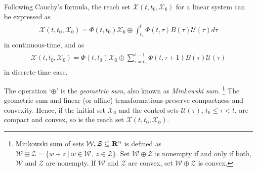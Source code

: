 \documentclass[letterpaper,10pt,english]{sphinxmanual}
\begin{document}
Following Cauchy’s formula, the reach set
${\mathcal X}(t, t_0, {\mathcal X}_0)$ for a linear system can be
expressed as
\label{chap_reach:equation-ctlsrs}\begin{gather}
\begin{split}{\mathcal X}(t, t_0, {\mathcal X}_0) =
\Phi(t, t_0){\mathcal X}_0 \oplus \int_{t_0}^t\Phi(t, \tau)B(\tau){\mathcal U}(\tau)d\tau\end{split}\label{chap_reach-ctlsrs}
\end{gather}
in continuous-time, and as
\label{chap_reach:equation-dtlsrs}\begin{gather}
\begin{split}{\mathcal X}(t, t_0, {\mathcal X}_0) =
\Phi(t, t_0){\mathcal X}_0 \oplus \sum_{\tau=t_0}^{t-1}\Phi(t, \tau+1)B(\tau){\mathcal U}(\tau)\end{split}\label{chap_reach-dtlsrs}
\end{gather}
in discrete-time case.

The operation ‘$\oplus$’ is the \emph{geometric sum}, also known as
\emph{Minkowski sum}. \footnote{
Minkowski sum of sets
${\mathcal W}, {\mathcal Z}\subseteq {\bf R}^n$ is defined as
${\mathcal W}\oplus {\mathcal Z}= \{w+z ~|~ w\in{\mathcal W}, ~ z\in{\mathcal Z}\}$.
Set ${\mathcal W}\oplus{\mathcal Z}$ is nonempty if and only if
both, ${\mathcal W}$ and ${\mathcal Z}$ are nonempty. If
${\mathcal W}$ and ${\mathcal Z}$ are convex, set
${\mathcal W}\oplus{\mathcal Z}$ is convex.
} The geometric sum and linear (or affine)
transformations preserve compactness and convexity. Hence, if the
initial set ${\mathcal X}_0$ and the control sets
${\mathcal U}(\tau)$, $t_0\leqslant\tau<t$, are compact and
convex, so is the reach set
${\mathcal X}(t, t_0, {\mathcal X}_0)$.
\end{document}
